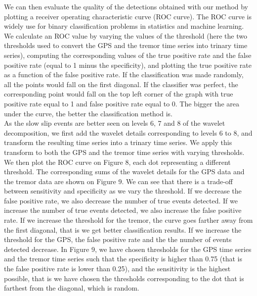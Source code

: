 \documentclass{article}
\begin{document}
We can then evaluate the quality of the detections obtained with our method by plotting a receiver operating characteristic curve (ROC curve). The ROC curve is widely use for binary classification problems in statistics and machine learning. We calculate an ROC value by varying the values of the threshold (here the two thresholds used to convert the GPS and the tremor time series into trinary time series), computing the corresponding values of the true positive rate and the false positive rate (equal to 1 minus the specificity), and plotting the true positive rate as a function of the false positive rate. If the classification was made randomly, all the points would fall on the first diagonal. If the classifier was perfect, the corresponding point would fall on the top left corner of the graph with true positive rate equal to 1 and false positive rate equal to 0. The bigger the area under the curve, the better the classification method is. \\

As the slow slip events are better seen on levels 6, 7 and 8 of the wavelet decomposition, we first add the wavelet details corresponding to levels 6 to 8, and transform the resulting time series into a trinary time series. We apply this transform to both the GPS and the tremor time series with varying thresholds. We then plot the ROC curve on Figure 8, each dot representing a different threshold. The corresponding sums of the wavelet details for the GPS data and the tremor data are shown on Figure 9. We can see that there is a trade-off between sensitivity and specificity as we vary the threshold. If we decrease the false positive rate, we also decrease the number of true events detected. If we increase the number of true events detected, we also increase the false positive rate. If we increase the threshold for the tremor, the curve goes farther away from the first diagonal, that is we get better classification results. If we increase the threshold for the GPS, the false positive rate and the the number of events detected decrease. In Figure 9, we have chosen thresholds for the GPS time series and the tremor time series such that the specificity is higher than 0.75 (that is the false positive rate is lower than 0.25), and the sensitivity is the highest possible, that is we have chosen the thresholds corresponding to the dot that is farthest from the diagonal, which is random. \\
\end{document}
